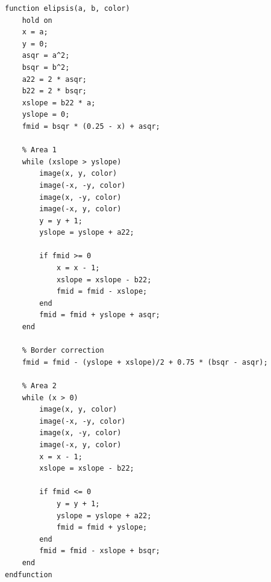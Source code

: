 \begin{lstlisting}[caption={Γενικός αλγόριθμος σχερδιασμού ελλειψής του Bresenham }]
function elipsis(a, b, color)
    hold on
    x = a;
    y = 0;
    asqr = a^2;
    bsqr = b^2;
    a22 = 2 * asqr;
    b22 = 2 * bsqr;
    xslope = b22 * a;
    yslope = 0;
    fmid = bsqr * (0.25 - x) + asqr;

    % Area 1
    while (xslope > yslope)
        image(x, y, color)
        image(-x, -y, color)
        image(x, -y, color)
        image(-x, y, color)
        y = y + 1;
        yslope = yslope + a22;

        if fmid >= 0
            x = x - 1;
            xslope = xslope - b22;
            fmid = fmid - xslope;
        end
        fmid = fmid + yslope + asqr;
    end

    % Border correction
    fmid = fmid - (yslope + xslope)/2 + 0.75 * (bsqr - asqr);

    % Area 2
    while (x > 0)
        image(x, y, color)
        image(-x, -y, color)
        image(x, -y, color)
        image(-x, y, color)
        x = x - 1;
        xslope = xslope - b22;

        if fmid <= 0
            y = y + 1;
            yslope = yslope + a22;
            fmid = fmid + yslope;
        end
        fmid = fmid - xslope + bsqr;
    end
endfunction
\end{lstlisting}